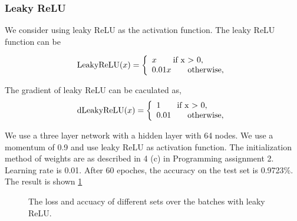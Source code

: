 \documentclass{article} %
\begin{document}
\subsubsection{Leaky ReLU}

We consider using leaky ReLU as the activation function. The leaky ReLU function can be 

\[
\textnormal{LeakyReLU}(x) =\left\{
\begin{array}{ll}
x \qquad \textnormal{if x $>$ 0,}\\
0.01x \qquad \textnormal{otherwise,}
\end{array}
\right.
\]

The gradient of leaky ReLU can be caculated as,
\[
\textnormal{dLeakyReLU}(x) =\left\{
\begin{array}{ll}
1 \qquad \textnormal{if x $>$ 0,}\\
0.01 \qquad \textnormal{otherwise,}
\end{array}
\right.
\]



We use a three layer network with a hidden layer with 64 nodes. We use a momentum of 0.9 and use leaky ReLU as activation function. The initialization method of weights are as described in 4 (c) in Programming assignment 2. Learning rate is 0.01. After 60 epoches, the accuracy on the test set is 0.9723\%. The result is shown \ref{Figure: leaky}



\begin{figure} [!htbp]
	
	\caption{The loss and accuacy of different sets over the batches with leaky ReLU. }  
	\label{Figure: leaky}
\end{figure}
\end{document}
